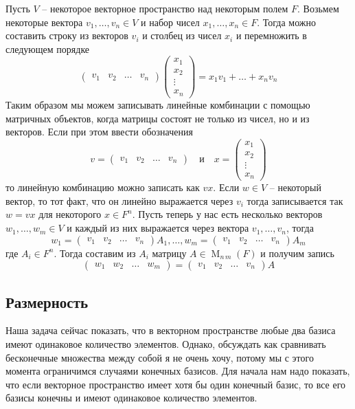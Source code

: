 Пусть $V$ -- некоторое векторное пространство над некоторым полем $F$.
Возьмем некоторые вектора $v_1,\ldots, v_n\in V$ и набор чисел $x_1,\ldots,x_n\in F$.
Тогда можно составить строку из векторов $v_i$ и столбец из чисел $x_i$ и перемножить в следующем порядке
\[
\begin{pmatrix}
{v_1}&{v_2}&{\ldots}&{v_n}
\end{pmatrix}
\begin{pmatrix}
{x_1}\\{x_2}\\{\vdots}\\{x_n}
\end{pmatrix}
=
x_1 v_1 + \ldots + x_n v_n
\]
Таким образом мы можем записывать линейные комбинации с помощью матричных объектов, когда матрицы состоят не только из чисел, но и из векторов.
Если при этом ввести обозначения
\[
v = 
\begin{pmatrix}
{v_1}&{v_2}&{\ldots}&{v_n}
\end{pmatrix}
\quad\text{и}\quad
x = 
\begin{pmatrix}
{x_1}\\{x_2}\\{\vdots}\\{x_n}
\end{pmatrix}
\]
то линейную комбинацию можно записать как $v x$.
Если $w\in V$ -- некоторый вектор, то тот факт, что он линейно выражается через $v_i$ тогда записывается так $w = vx$ для некоторого $x\in F^n$.
Пусть теперь у нас есть несколько векторов $w_1,\ldots, w_m\in V$ и каждый из них выражается через вектора $v_1,\ldots, v_n$, тогда
\[
w_1 = 
\begin{pmatrix}
{v_1}&{v_2}&{\ldots}&{v_n}
\end{pmatrix}
A_1,
\ldots,
w_m = 
\begin{pmatrix}
{v_1}&{v_2}&{\ldots}&{v_n}
\end{pmatrix}
A_m
\]
где $A_i\in F^n$.
Тогда составим из $A_i$ матрицу $A\in \operatorname{M}_{n\,m}(F)$ и получим запись
\[
\begin{pmatrix}
{w_1}&{w_2}&{\ldots}&{w_m}
\end{pmatrix}
=
\begin{pmatrix}
{v_1}&{v_2}&{\ldots}&{v_n}
\end{pmatrix}
A
\]

\subsection{Размерность}

Наша задача сейчас показать, что в векторном пространстве любые два базиса имеют одинаковое количество элементов.
Однако, обсуждать как сравнивать бесконечные множества между собой я не очень хочу, потому мы с этого момента ограничимся случаями конечных базисов.
Для начала нам надо показать, что если векторное пространство имеет хотя бы один конечный базис, то все его базисы конечны и имеют одинаковое количество элементов.

